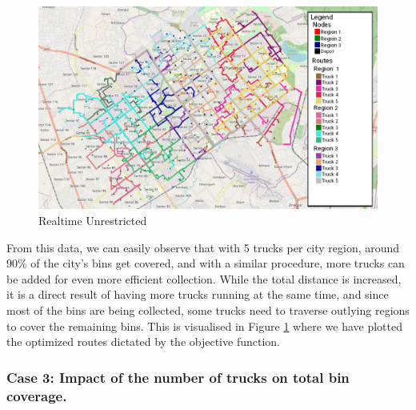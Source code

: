 \documentclass[12pt]{article}
\begin{document}
\begin{figure}[H]
    \centering
    \includegraphics[scale=0.4]{Dynamic_weighted_5_Truck.png} %
    \caption{Realtime Unrestricted}\label{fig2}
\end{figure}

From this data, we can easily observe that with 5 trucks per city region, around 90\% of the city's bins get covered, and with a similar procedure, more trucks can be added for even more efficient collection. While the total distance is increased, it is a direct result of having more trucks running at the same time, and since most of the bins are being collected, some trucks need to traverse outlying regions to cover the remaining bins. This is visualised in Figure \ref{fig2} where we have plotted the optimized routes dictated by the objective function.

\subsubsection*{Case 3: Impact of the number of trucks on total bin coverage.}
\end{document}
